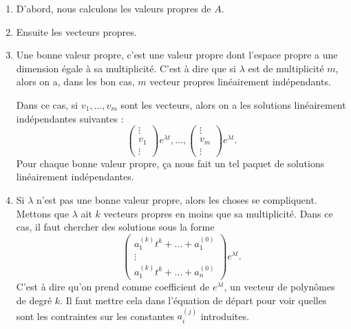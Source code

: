 \let\oldTheEnumi\theenumi
\renewcommand{\theenumi}{\arabic{enumi}.}
\begin{enumerate}

\item 
D'abord, nous calculons les valeurs propres de $A$.

\item
Ensuite les vecteurs propres.

\item\label{ItemRapSystDc}
Une bonne valeur propre, c'est une valeur propre dont l'espace propre a une dimension égale à sa multiplicité. C'est à dire que si $\lambda$ est de multiplicité $m$, alors on a, dans les bon cas,  $m$ vecteur propres linéairement indépendants.

Dans ce cas, si $v_1,\ldots,v_m$ sont les vecteurs, alors on a les solutions linéairement indépendantes suivantes :
\begin{equation}
	\begin{pmatrix}
	\vdots	\\ 
	v_1	\\ 
		\vdots	
\end{pmatrix} e^{\lambda t},\ldots,
\begin{pmatrix}
	\vdots		\\ 
	v_m	\\ 
	\vdots		
\end{pmatrix} e^{\lambda t}.
\end{equation}
Pour chaque bonne valeur propre, ça nous fait un tel paquet de solutions linéairement indépendantes.

\item
Si $\lambda$ n'est pas une bonne valeur propre, alors les choses se compliquent. Mettons que $\lambda$ ait $k$ vecteurs propres en moins que sa multiplicité. Dans ce cas, il faut chercher des solutions sous la forme
\begin{equation}		\label{EqEqRapAsTestPolk}
	 \begin{pmatrix}
	a^{(k)}_1t^k+\ldots+a_1^{(0)}	\\ 
	\vdots	\\ 
	a^{(k)}_1t^k+\ldots+a_n^{(0)}		
\end{pmatrix} e^{\lambda t}.
\end{equation}
C'est à dire qu'on prend comme coefficient de $ e^{\lambda t}$, un vecteur de polynômes de degré $k$. Il faut mettre cela dans l'équation de départ pour voir quelles sont les contraintes sur les constantes $a_i^{(j)}$ introduites.


\end{enumerate}
